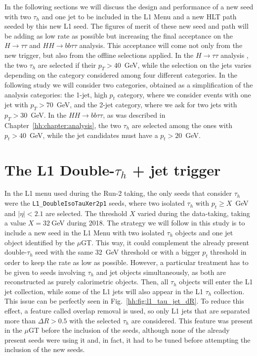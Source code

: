 \documentclass[../main.tex]{subfiles}
\begin{document}
In the following sections we will discuss the design and performance of a new seed with two $\tau_h$ and one jet to be included in the L1 Menu and a new HLT path seeded by this new L1 seed. The figures of merit of these new seed and path will be adding as low rate as possible but increasing the final acceptance on the $H\to\tau\tau$ and $HH\to bb\tau\tau$ analysis. This acceptance will come not only from the new trigger, but also from the offline selections applied. In the $H\to\tau\tau$ analysis \cite{hh:htt_run2}, the two $\tau_h$ are selected if their $p_T > 40$~GeV, while the selection on the jets varies depending on the category considered among four different categories. In the following study we will consider two categories, obtained as a simplification of the analysis categories: the 1-jet, high $p_t$ category, where we consider events with one jet with $p_T > 70$~GeV, and the 2-jet category, where we ask for two jets with $p_T > 30$~GeV. In the $HH\to bb\tau\tau$, as was described in Chapter~\ref{hh:chapter:analysis}, the two $\tau_h$ are selected among the ones with $p_t>40$~GeV, while the jet candidates must have a $p_t>20$~GeV.



\section{The L1 Double-$\tau_h$ + jet trigger}
\label{hh:sec:l1seeds}

In the L1 menu used during the Run-2 taking, the only seeds that consider $\tau_h$ were the \texttt{L1\_DoubleIsoTauXer2p1} seeds, where two isolated $\tau_h$ with $p_t\geq X$~GeV and $|\eta|<2.1$ are selected. The threshold $X$ varied during the data-taking, taking a value $X=32~$GeV during 2018. The strategy we will follow in this study is to include a new seed in the L1 Menu with two isolated $\tau_h$ objects and one jet object identified by the $\mu$GT. This way, it could complement the already present double-$\tau_h$ seed with the same 32~GeV threshold or with a bigger $p_t$ threshold in order to keep the rate as low as possible. However, a particular treatment has to be given to seeds involving $\tau_h$ and jet objects simultaneously, as both are reconstructed as purely calorimetric objects. Then, all $\tau_h$ objects will enter the L1 jet collection, while some of the L1 jets will also appear in the L1 $\tau_h$ collection. This issue can be perfectly seen in Fig.~\ref{hh:fig:l1_tau_jet_dR}. To reduce this effect, a feature called overlap removal \cite{intro:l1_13tev} is used, so only L1 jets that are separated more than $\Delta R>0.5$ with the selected $\tau_h$ are considered. This feature was present in the $\mu$GT before the inclusion of the seeds, although none of the already present seeds were using it and, in fact, it had to be tuned before attempting the inclusion of the new seeds.
\end{document}
